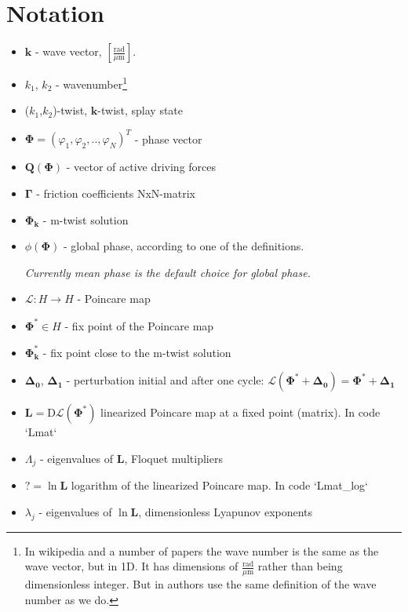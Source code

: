 \documentclass[a4paper,10pt]{article}
\renewcommand*{\vec}[1]{\mathbf{#1}}
\newcommand*{\Lmat}{\mathbf{L}}  %
\begin{document}
\setcounter{secnumdepth}{2} %
\setcounter{tocdepth}{2} %

\tableofcontents

\clearpage



\section{Notation}

\begin{itemize}
\item $\mathbf{k}$ - wave vector, $[\frac{\text{rad}}{\mu\text{m}}]$. 
\item $k_1$, $k_2$ - wavenumber\footnote{In wikipedia and a number of papers the wave number is the same as the wave vector, but in 1D. It has dimensions of $\frac{\text{rad}}{\mu\text{m}}$ rather than being dimensionless integer. But in \cite{zou2009} authors use the same definition of the wave number as we do.}
\item ($k_1$,$k_2$)-twist, $\vec{k}$-twist, splay state \cite{strogatz1993}
		
\item $\mathbf{\Phi}= (\varphi_1, \varphi_2, .., \varphi_{N})^T $ - phase vector
\item $ \mathbf{Q(\Phi)}$ - vector of active driving forces
\item $ \mathbf{\Gamma}$ - friction coefficients NxN-matrix
\item $\mathbf{\Phi_k}$ - m-twist solution
\item $\phi(\mathbf{\Phi})$ - global phase, according to one of the definitions. 

	\textit{Currently mean phase is the default choice for global phase.}
\item $\mathcal{L}: H \rightarrow H$ - Poincare map
\item $\mathbf{\Phi^*} \in H$ - fix point of the Poincare map
\item $\mathbf{\Phi^{*}_k}$ - fix point close to the m-twist solution
\item $\mathbf{\Delta_0}$, $\mathbf{\Delta_1}$ - perturbation initial and after one cycle: $\mathcal{L}(\mathbf{\Phi^{*}} + \mathbf{\Delta_0}) = \mathbf{\Phi^{*}} + \mathbf{\Delta_1}$
\item $\mathbf{L} = \mathrm{D}\mathcal{L}(\mathbf{\Phi^*})$ linearized Poincare map at a fixed point (matrix). In code `Lmat`
\item $\Lambda_j$ - eigenvalues of $\Lmat$, Floquet multipliers
\item $? = \ln \Lmat $  logarithm of the linearized Poincare map. In code `Lmat\_log`
\item $\lambda_j$ - eigenvalues of $\ln \mathbf{L}$, dimensionless Lyapunov exponents
\end{itemize}
\end{document}
